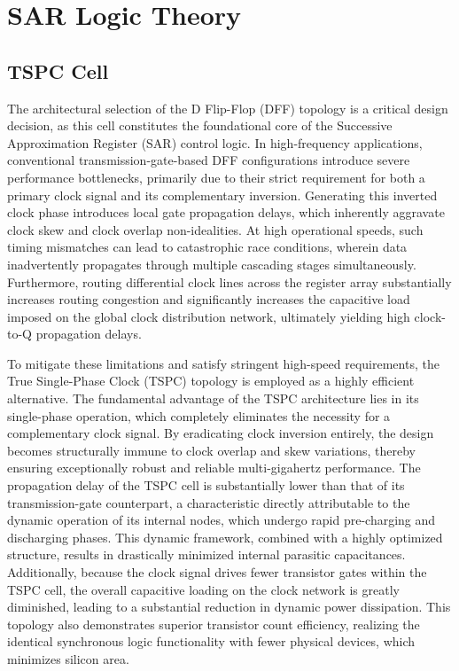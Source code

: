 \section{SAR Logic Theory}
\label{sar}
\subsection{TSPC Cell}

The architectural selection of the D Flip-Flop (DFF) topology is a critical design decision,
as this cell constitutes the foundational core of the Successive Approximation Register (SAR)
control logic. In high-frequency applications, conventional transmission-gate-based DFF
configurations introduce severe performance bottlenecks, primarily due to their strict
requirement for both a primary clock signal and its complementary inversion. Generating this
inverted clock phase introduces local gate propagation delays, which inherently aggravate clock
skew and clock overlap non-idealities. At high operational speeds, such timing mismatches can
lead to catastrophic race conditions, wherein data inadvertently propagates through multiple
cascading stages simultaneously. Furthermore, routing differential clock lines across the
register array substantially increases routing congestion and significantly increases the
capacitive load imposed on the global clock distribution network, ultimately yielding high
clock-to-Q propagation delays.

To mitigate these limitations and satisfy stringent high-speed requirements, the True
Single-Phase Clock (TSPC) topology is employed as a highly efficient alternative. The
fundamental advantage of the TSPC architecture lies in its single-phase operation, which
completely eliminates the necessity for a complementary clock signal. By eradicating clock
inversion entirely, the design becomes structurally immune to clock overlap and skew
variations, thereby ensuring exceptionally robust and reliable multi-gigahertz performance.
The propagation delay of the TSPC cell is substantially lower than that of its
transmission-gate counterpart, a characteristic directly attributable to the dynamic operation
of its internal nodes, which undergo rapid pre-charging and discharging phases. This dynamic
framework, combined with a highly optimized structure, results in drastically minimized
internal parasitic capacitances. Additionally, because the clock signal drives fewer transistor
gates within the TSPC cell, the overall capacitive loading on the clock network is greatly
diminished, leading to a substantial reduction in dynamic power dissipation. This topology also
demonstrates superior transistor count efficiency, realizing the identical synchronous logic
functionality with fewer physical devices, which minimizes silicon area.

